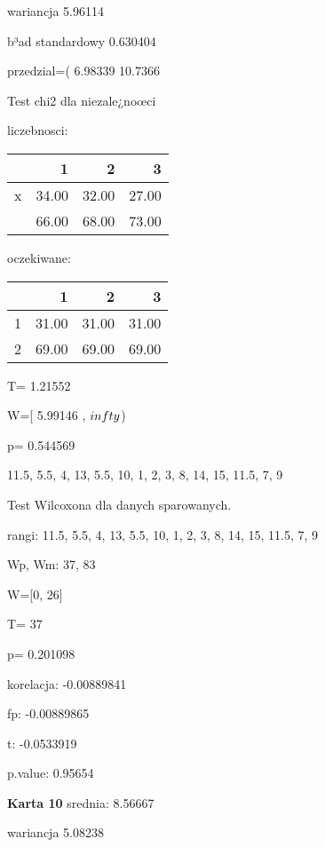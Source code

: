 \documentclass[a4paper,12pt]{article}
\begin{document}
\begin{multicols}{3}
     wariancja 5.96114  
     
     b³ad standardowy 0.630404 
     
     przedzial=( 6.98339 10.7366 \vspace{1cm} 

  Test chi2 dla niezale¿noœci 
   
   liczebnosci: %
\begin{tabular}{rrrr}
  \hline
 & 1 & 2 & 3 \\
  \hline
x & 34.00 & 32.00 & 27.00 \\
   & 66.00 & 68.00 & 73.00 \\
   \hline
\end{tabular}
 
   
   oczekiwane: %
\begin{tabular}{rrrr}
  \hline
 & 1 & 2 & 3 \\
  \hline
1 & 31.00 & 31.00 & 31.00 \\
  2 & 69.00 & 69.00 & 69.00 \\
   \hline
\end{tabular}
 
   
   T= 1.21552 
   
   W=[ 5.99146 , $\\infty$) 
   
   p= 0.544569 \vspace{1cm} 

  11.5, 5.5, 4, 13, 5.5, 10, 1, 2, 3, 8, 14, 15, 11.5, 7, 9 

  Test Wilcoxona dla danych sparowanych. 
  
  rangi: 11.5, 5.5, 4, 13, 5.5, 10, 1, 2, 3, 8, 14, 15, 11.5, 7, 9 
  
  Wp, Wm:  37,  83 
  
  W=[0, 26]  
  
  T=  37 
  
  p= 0.201098 \vspace{1cm} 

  korelacja: -0.00889841
     
     fp: -0.00889865
     
     t: -0.0533919
     
     p.value: 0.95654 \vspace{1cm} 

  \textbf{Karta  10 } 
 srednia: 8.56667 
     
     wariancja 5.08238  
     

\end{multicols}
\end{document}
